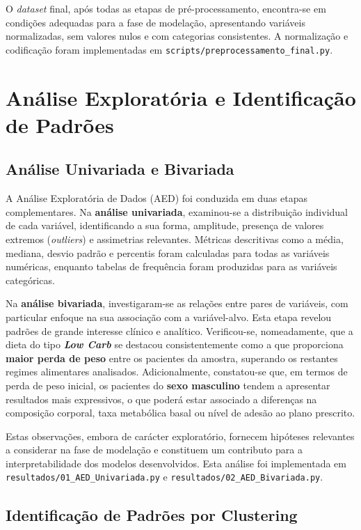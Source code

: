 O \textit{dataset} final, após todas as etapas de pré-processamento, encontra-se em condições adequadas para a fase de modelação, apresentando variáveis normalizadas, sem valores nulos e com categorias consistentes. A normalização e codificação foram implementadas em \texttt{scripts/preprocessamento\_final.py}.


\section{Análise Exploratória e Identificação de Padrões}
\label{sec:eda}

\subsection{Análise Univariada e Bivariada}

A Análise Exploratória de Dados (AED) foi conduzida em duas etapas complementares. Na \textbf{análise univariada}, examinou-se a distribuição individual de cada variável, identificando a sua forma, amplitude, presença de valores extremos (\textit{outliers}) e assimetrias relevantes. Métricas descritivas como a média, mediana, desvio padrão e percentis foram calculadas para todas as variáveis numéricas, enquanto tabelas de frequência foram produzidas para as variáveis categóricas.

Na \textbf{análise bivariada}, investigaram-se as relações entre pares de variáveis, com particular enfoque na sua associação com a variável-alvo. Esta etapa revelou padrões de grande interesse clínico e analítico. Verificou-se, nomeadamente, que a dieta do tipo \textbf{\textit{Low Carb}} se destacou consistentemente como a que proporciona \textbf{maior perda de peso} entre os pacientes da amostra, superando os restantes regimes alimentares analisados. Adicionalmente, constatou-se que, em termos de perda de peso inicial, os pacientes do \textbf{sexo masculino} tendem a apresentar resultados mais expressivos, o que poderá estar associado a diferenças na composição corporal, taxa metabólica basal ou nível de adesão ao plano prescrito.

Estas observações, embora de carácter exploratório, fornecem hipóteses relevantes a considerar na fase de modelação e constituem um contributo para a interpretabilidade dos modelos desenvolvidos. Esta análise foi implementada em \texttt{resultados/01\_AED\_Univariada.py} e \texttt{resultados/02\_AED\_Bivariada.py}.

\subsection{Identificação de Padrões por Clustering}

